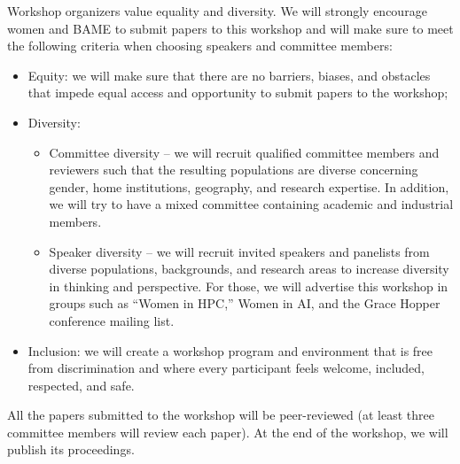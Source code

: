\documentclass{article}
\begin{document}
Workshop organizers value equality and diversity. We will strongly encourage women and BAME to submit papers to this workshop and will make sure to meet the following criteria when choosing speakers and committee members:
\begin{itemize}
\item Equity: we will make sure that
there are no barriers, biases, and obstacles that impede equal access and opportunity to submit papers to the workshop;
\item Diversity: 
\begin{itemize}
\item Committee diversity – we will recruit qualified committee members and reviewers such that the resulting populations are diverse concerning gender, home institutions, geography, and research expertise. In addition, we will try to have a mixed committee containing academic and industrial members. 
\item Speaker diversity – we will recruit invited speakers and panelists from diverse populations, backgrounds, and research areas to increase diversity in thinking and perspective. For those, we will advertise this workshop in groups such as “Women in HPC,” Women in AI, and the Grace Hopper conference mailing list.
\end{itemize}
\item Inclusion: we will create a workshop program and environment that is free from discrimination and where every participant feels welcome, included, respected, and safe.
\end{itemize}

All the papers submitted to the workshop will be peer-reviewed  (at least three committee members will review each paper). At the end of the workshop, we will publish its proceedings.
\end{document}
